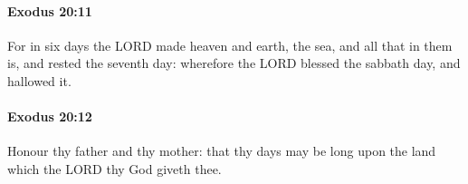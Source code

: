 		\paragraph{Exodus 20:11} %
			\label{EXODUS-20-11}

			For in six days the LORD made heaven and earth, the sea, and all that in them is, and rested the seventh day: wherefore the LORD blessed the sabbath day, and hallowed it.


		\paragraph{Exodus 20:12} %
			\label{EXODUS-20-12}

			Honour thy father and thy mother: that thy days may be long upon the land which the LORD thy God giveth thee.


